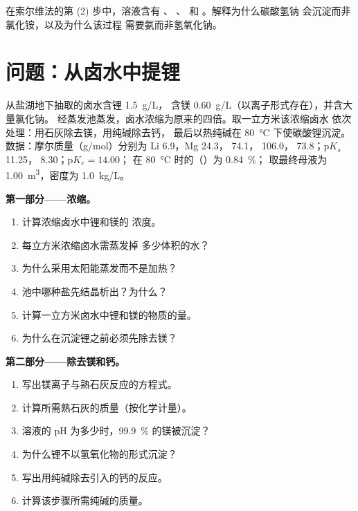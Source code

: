 \begin{exercise}[$\star\star\star$]\label{exo:b1:s-block:12}
在索尔维法的第 (2) 步中，溶液含有 、
、 和 。解释为什么碳酸氢钠
会沉淀而非氯化铵，以及为什么该过程
需要氨而非氢氧化钠。
\end{exercise}

\section{问题：从卤水中提锂}

\begin{problem}
\label{pb:b1:s-block:1}
从盐湖地下抽取的卤水含锂 \qty{1.5}{g/L}，
含镁 \qty{0.60}{g/L}（以离子形式存在），并含大量氯化钠。
经蒸发池蒸发，卤水浓缩为原来的四倍。取一立方米该浓缩卤水
依次处理：用石灰除去镁，用纯碱除去钙，
最后以热纯碱在 \qty{80}{\celsius} 下使碳酸锂沉淀。
数据：摩尔质量（\unit{g/mol}）分别为 Li 6.9，Mg 24.3，
 74.1， 106.0， 73.8；$\mathrm{p}K_s$
 11.25， 8.30；$\mathrm{p}K_e = 14.00$；
 在 \qty{80}{\celsius} 时的（）为 \qty{0.84}{\percent}；
取最终母液为 \qty{1.00}{m^3}，密度为 \qty{1.0}{kg/L}。

\medskip
\noindent\textbf{第一部分——浓缩。}
\begin{enumerate}
  \item 计算浓缩卤水中锂和镁的
        浓度。
  \item 每立方米浓缩卤水需蒸发掉
        多少体积的水？
  \item 为什么采用太阳能蒸发而不是加热？
  \item 池中哪种盐先结晶析出？为什么？
  \item 计算一立方米卤水中锂和镁的物质的量。
  \item 为什么在沉淀锂之前必须先除去镁？
\end{enumerate}

\medskip
\noindent\textbf{第二部分——除去镁和钙。}
\begin{enumerate}[resume]
  \item 写出镁离子与熟石灰反应的方程式。
  \item 计算所需熟石灰的质量（按化学计量）。
  \item 溶液的 pH 为多少时，\qty{99.9}{\percent} 的镁被沉淀？
  \item 为什么锂不以氢氧化物的形式沉淀？
  \item 写出用纯碱除去引入的钙的反应。
  \item 计算该步骤所需纯碱的质量。
\end{enumerate}


\end{problem}

